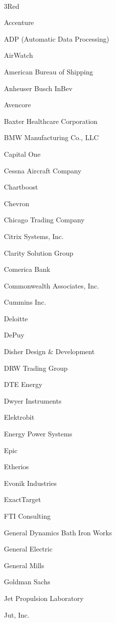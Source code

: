 \documentclass[twoside]{article}
\begin{document}
\begin{center}
\begin{multicols}{5}
        ~\hrulefill~
        \vspace{-.9em}
        \begin{FlushLeft}
        \begin{compactitem}
        \item 3Red
\item Accenture
\item ADP (Automatic Data Processing)
\item AirWatch
\item American Bureau of Shipping
\item Anheuser Busch InBev
\item Avencore
\item Baxter Healthcare Corporation
\item BMW Manufacturing Co., LLC
\item Capital One
\item Cessna Aircraft Company
\item Chartboost
\item Chevron
\item Chicago Trading Company
\item Citrix Systems, Inc.
\item Clarity Solution Group
\item Comerica Bank
\item Commonwealth Associates, Inc.
\item Cummins Inc.
\item Deloitte
\item DePuy
\item Disher Design \& Development
\item DRW Trading Group
\item DTE Energy
\item Dwyer Instruments
\item Elektrobit
\item Energy Power Systems
\item Epic
\item Etherios
\item Evonik Industries
\item ExactTarget
\item FTI Consulting
\item General Dynamics Bath Iron Works
\item General Electric
\item General Mills
\item Goldman Sachs
\item Jet Propulsion Laboratory
\item Jut, Inc.

\end{compactitem}
\end{FlushLeft}
\end{multicols}
\end{center}
\end{document}
